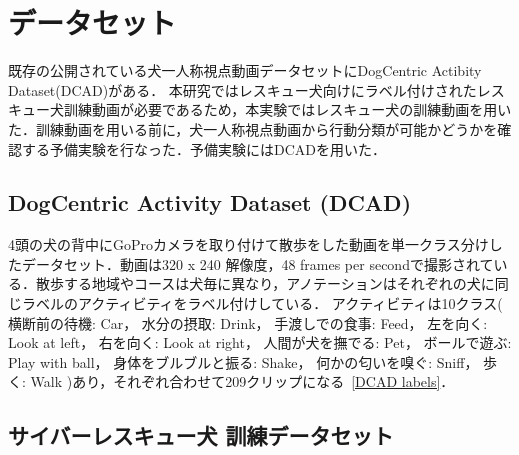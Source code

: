 \chapter{データセット}
既存の公開されている犬一人称視点動画データセットにDogCentric Actibity Dataset(DCAD)がある．
本研究ではレスキュー犬向けにラベル付けされたレスキュー犬訓練動画が必要であるため，本実験ではレスキュー犬の訓練動画を用いた．訓練動画を用いる前に，犬一人称視点動画から行動分類が可能かどうかを確認する予備実験を行なった．予備実験にはDCADを用いた．
\section{DogCentric Activity Dataset (DCAD)}
4頭の犬の背中にGoProカメラを取り付けて散歩をした動画を単一クラス分けしたデータセット．動画は320 x 240 解像度，48 frames per secondで撮影されている．散歩する地域やコースは犬毎に異なり，アノテーションはそれぞれの犬に同じラベルのアクティビティをラベル付けしている．
アクティビティは10クラス(
横断前の待機: Car， 水分の摂取: Drink， 手渡しでの食事: Feed， 左を向く: Look at left， 右を向く: Look at right， 人間が犬を撫でる: Pet， ボールで遊ぶ: Play with ball， 身体をブルブルと振る: Shake， 何かの匂いを嗅ぐ: Sniff， 歩く: Walk
)あり，それぞれ合わせて209クリップになる~\ref{DCAD labels}．
\begin{table}[tb]
\end{table}
\section{サイバーレスキュー犬 訓練データセット}


